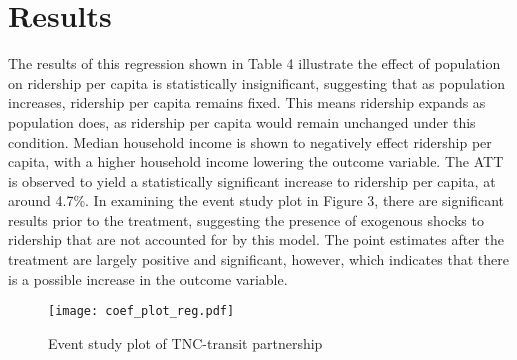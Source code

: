 \documentclass [12pt]{report}
\begin{document}
\section*{Results}
The results of this regression shown in Table 4 illustrate the effect of population on ridership per capita is statistically insignificant, suggesting that as population increases, ridership per capita remains fixed. This means ridership expands as population does, as ridership per capita would remain unchanged under this condition. Median household income is shown to negatively effect ridership per capita, with a higher household income lowering the outcome variable. The ATT is observed to yield a statistically significant increase to ridership per capita, at around 4.7\%. In examining the event study plot in Figure 3, there are significant results prior to the treatment, suggesting the presence of exogenous shocks to ridership that are not accounted for by this model. The point estimates after the treatment are largely positive and significant, however, which indicates that there is a possible increase in the outcome variable.\\
\begin{figure}[H]
    \centering
    \texttt{[image: coef\_plot\_reg.pdf]} %
    \caption{Event study plot of TNC-transit partnership}
\end{figure}
\end{document}
